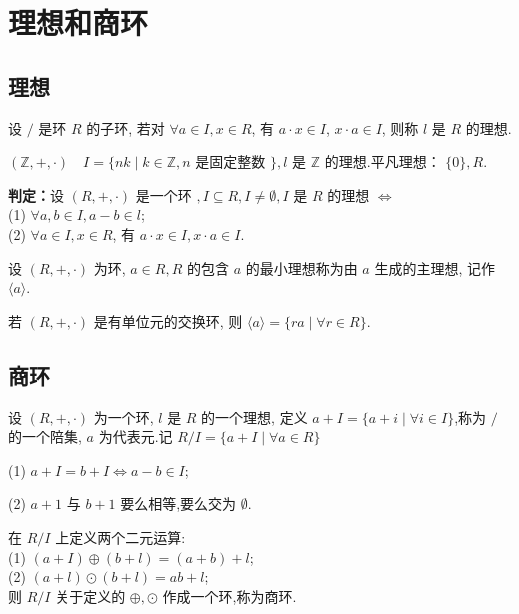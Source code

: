 \section{ 理想和商环}
\subsection{理想}
\begin{definition}
    设 $ / $ 是环 $ R $ 的子环, 若对 $ \forall a \in I, x \in R $, 有 $ a \cdot x \in I $, $ x \cdot a \in I $, 则称 $ l $ 是 $ R $ 的理想.
\end{definition}
\begin{example}
    $ (\mathbb{Z},+, \cdot) \quad I=\{n k \mid k \in \mathbb{Z}, n $ 是固定整数 $ \}, l $ 是 $ \mathbb{Z} $ 的理想.平凡理想： $ \{0\}, R $.
\end{example}

 \textbf{判定：}设 $ (R,+, \cdot) $ 是一个环 $ , I \subseteq R, I \neq \emptyset, I $ 是 $ R $ 的理想 $ \Leftrightarrow $\\
(1) $ \forall a, b \in I, a-b \in l $;\\
(2) $ \forall a \in I, x \in R $, 有 $ a \cdot x \in I, x \cdot a \in I $.
\begin{definition}
    设 $ (R,+, \cdot) $ 为环, $ a \in R, R $ 的包含 $ a $ 的最小理想称为由 $ a $ 生成的主理想, 记作 $ \langle a\rangle $.
\end{definition}

\begin{theorem}
    若 $ (R,+, \cdot) $ 是有单位元的交换环, 则 $ \langle a\rangle=\{r a \mid \forall r \in R\} $.
\end{theorem}

\subsection{商环}
\begin{definition}
    设 $ (R,+, \cdot) $ 为一个环, $ l $ 是 $ R $ 的一个理想, 定义 $ a+I=\{a+i \mid \forall i \in I\} $,称为 $ / $ 的一个陪集, $ a $ 为代表元.记 $ R / I=\{a+I \mid \forall a \in R\} $
\end{definition}
\begin{remark}

    (1) $ a+I=b+I \Leftrightarrow a-b \in I $;
    
(2) $ a+1 $ 与 $ b+1 $ 要么相等,要么交为 $ \emptyset $.
\end{remark}
\begin{definition}
    在 $ R / I $ 上定义两个二元运算:\\
(1) $ (a+I) \oplus(b+l)=(a+b)+l $;\\
(2) $ (a+l) \odot(b+l)=a b+l $;\\
则 $ R / I $ 关于定义的 $ \oplus, \odot $ 作成一个环,称为商环.
\end{definition}

